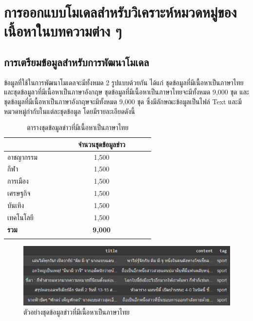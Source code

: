 \documentclass[12pt,oneside,openright,a4paper]{cpe-thai-project}
\begin{document}
  \section{การออกแบบโมเดลสำหรับวิเคราะห์หมวดหมู่ของเนื้อหาในบทความต่าง ๆ}
    \subsection{การเตรียมข้อมูลสำหรับการพัฒนาโมเดล}
      \hspace{1cm}ข้อมูลที่ใช้ในการพัฒนาโมเดลจะมีทั้งหมด 2 รูปแบบด้วยกัน ได้แก่ ชุดข้อมูลที่มีเนื้อหาเป็นภาษาไทยและชุดข้อมูลวที่มีเนื้อหาเป็นภาษาอังกฤษ
      ชุดข้อมูลที่มีเนื้อหาเป็นภาษาไทยจะมีทั้งหมด 9,000 ชุด และชุดข้อมูลที่มีเนื้อหาเป็นภาษาอังกฤษจะมีทั้งหมด 9,000 ชุด ซึ่งมีลักษณะข้อมูลเป็นไฟล์ Text
      และมีหมวดหมู่กำกับในแต่ละชุดข้อมูล โดยมีรายละเอียดดังนี้

      \begin{longtable}[!ht]{p{0.15\linewidth}m{0.45\linewidth}}
        \caption{ตารางชุดข้อมูลข่าวที่มีเนื้อหาเป็นภาษาไทย}
        \label{tbl:new_th}\\
        \hhline{==}
        \multicolumn{1}{c}{\textbf{หมวดหมู่}} & \multicolumn{1}{c}{\textbf{จำนวนชุดข้อมูลข่าว}} \\ \hline
        \endhead
        อาชญากรรม                              & \multicolumn{1}{c}{1,500}                        \\ %
        กีฬา                                   & \multicolumn{1}{c}{1,500}                         \\ %
        การเมือง                               & \multicolumn{1}{c}{1,500}                          \\ %
        เศรษฐกิจ                                 & \multicolumn{1}{c}{1,500}                          \\ %
        บันเทิง                                & \multicolumn{1}{c}{1,500}                          \\ %
        เทคโนโลยี                              & \multicolumn{1}{c}{1,500}                          \\ \hline
        \textbf{รวม}                           & \multicolumn{1}{c}{\textbf{9,000}}                        \\ \hhline{==}
      \end{longtable}

      \begin{figure}[!ht]\centering
        \includegraphics[width=13cm]{./img/news_th.png}
        \caption{ตัวอย่างชุดข้อมูลข่าวที่มีเนื้อหาเป็นภาษาไทย}\label{fig:new_th}
      \end{figure}
\end{document}
